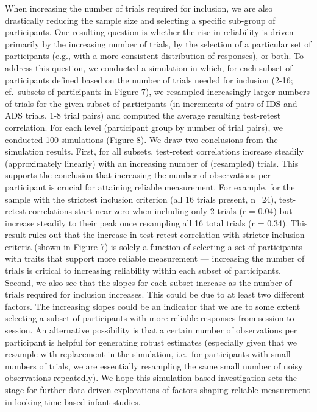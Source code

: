 \documentclass[
  man, donotrepeattitle,floatsintext]{apa6}
\begin{document}
When increasing the number of trials required for inclusion, we are also drastically reducing the sample size and selecting a specific sub-group of participants.
One resulting question is whether the rise in reliability is driven primarily by the increasing number of trials, by the selection of a particular set of participants (e.g., with a more consistent distribution of responses), or both.
To address this question, we conducted a simulation in which, for each subset of participants defined based on the number of trials needed for inclusion (2-16; cf.~subsets of participants in Figure 7), we resampled increasingly larger numbers of trials for the given subset of participants (in increments of pairs of IDS and ADS trials, 1-8 trial pairs) and computed the average resulting test-retest correlation.
For each level (participant group by number of trial pairs), we conducted 100 simulations (Figure 8).
We draw two conclusions from the simulation results.
First, for all subsets, test-retest correlations increase steadily (approximately linearly) with an increasing number of (resampled) trials.
This supports the conclusion that increasing the number of observations per participant is crucial for attaining reliable measurement.
For example, for the sample with the strictest inclusion criterion (all 16 trials present, n=24), test-retest correlations start near zero when including only 2 trials (r = 0.04) but increase steadily to their peak once resampling all 16 total trials (r = 0.34).
This result rules out that the increase in test-retest correlation with stricter inclusion criteria (shown in Figure 7) is solely a function of selecting a set of participants with traits that support more reliable measurement --- increasing the number of trials is critical to increasing reliability within each subset of participants.
Second, we also see that the slopes for each subset increase as the number of trials required for inclusion increases.
This could be due to at least two different factors.
The increasing slopes could be an indicator that we are to some extent selecting a subset of participants with more reliable responses from session to session.
An alternative possibility is that a certain number of observations per participant is helpful for generating robust estimates (especially given that we resample with replacement in the simulation, i.e.~for participants with small numbers of trials, we are essentially resampling the same small number of noisy observations repeatedly).
We hope this simulation-based investigation sets the stage for further data-driven explorations of factors shaping reliable measurement in looking-time based infant studies.
\end{document}
